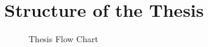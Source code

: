 \section{Structure of the Thesis}

\begin{figure}[h]
      \centering
      \caption{Thesis Flow Chart}\label{fig:thes_str.png}
\end{figure}

\clearpage